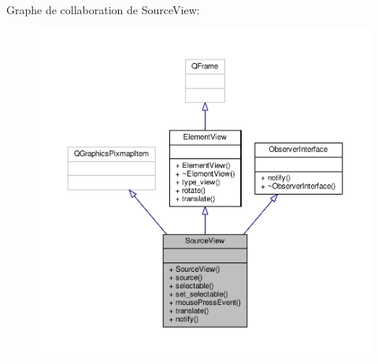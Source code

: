 Graphe de collaboration de Source\+View\+:
\nopagebreak
\begin{figure}[H]
\begin{center}
\leavevmode
\includegraphics[width=350pt]{d2/df3/classSourceView__coll__graph}
\end{center}
\end{figure}
